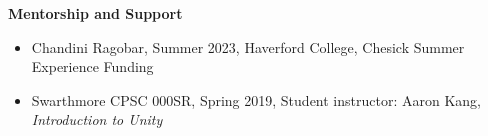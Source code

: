 {\bf Mentorship and Support} 
\vspace{-1.0em}

\begin{itemize}[leftmargin=*,label={}]
\item Chandini Ragobar, Summer 2023, Haverford College, Chesick Summer Experience Funding
\item Swarthmore CPSC 000SR, Spring 2019, Student instructor: Aaron Kang, \textit{Introduction to Unity}
\end{itemize}


